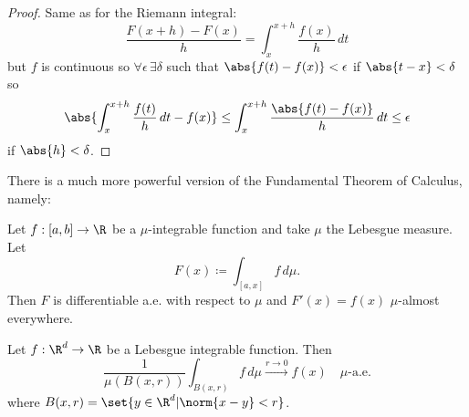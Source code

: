 \documentclass{article}
\newcommand{\1}[1]{\mathbbm{1}_{#1}}
\begin{document}
\begin{proof}
    Same as for the Riemann integral:
    \begin{equation*}
        \frac{F(x+h) - F(x)}{h} = \int_x^{x+h} \frac{f(x)}{h} \,dt
    \end{equation*}
    but $f$ is continuous so $\forall \epsilon \, \exists \delta$ such that $\abs{f(t) - f(x)} < \epsilon $ if $\abs{t - x} < \delta$ so
    \begin{equation*}
        \abs{\int_x^{x+h} \frac{f(t)}{h} \, dt - f(x)} \leq \int_x^{x+h} \frac{\abs{f(t) - f(x)}}{h} \,dt \leq \epsilon
    \end{equation*}
    if $\abs{h} < \delta$.
\end{proof}

\begin{remark}
    There is a much more powerful version of the Fundamental Theorem of Calculus, namely:
\end{remark}

\begin{thm}
    Let $f: [a, b] \to \R$ be a $\mu$-integrable function and take $\mu$ the Lebesgue measure.
    Let
    \begin{equation*}
        F(x) \coloneqq \int_{[a,x]} f \, d\mu.
    \end{equation*}
    Then $F$ is differentiable a.e. with respect to $\mu$ and $F'(x) = f(x)$ $\mu$-almost everywhere.
\end{thm}

\begin{thm}
    Let $f: \R^d \to \R$ be a Lebesgue integrable function. Then
    \begin{equation*}
        \frac{1}{\mu(B(x, r))} \int_{B(x, r)} f \, d\mu \xrightarrow{r \to 0} f(x) \quad \mu\text{-a.e.}
    \end{equation*}
    where $B(x,r) = \set{y \in \R^d | \norm{x - y} < r}$.
\end{thm}
\end{document}
